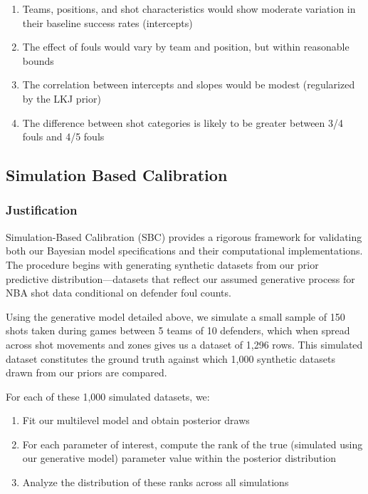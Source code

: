 \documentclass[
  letterpaper,
  DIV=11,
  numbers=noendperiod]{scrartcl}
\begin{document}
\begin{enumerate}
\def\labelenumi{\arabic{enumi}.}
\item
  Teams, positions, and shot characteristics would show moderate
  variation in their baseline success rates (intercepts)
\item
  The effect of fouls would vary by team and position, but within
  reasonable bounds
\item
  The correlation between intercepts and slopes would be modest
  (regularized by the LKJ prior)
\item
  The difference between shot categories is likely to be greater between
  3/4 fouls and 4/5 fouls
\end{enumerate}

\subsection{Simulation Based
Calibration}\label{simulation-based-calibration}

\subsubsection{Justification}\label{justification}

Simulation-Based Calibration (SBC) provides a rigorous framework for
validating both our Bayesian model specifications and their
computational implementations. The procedure begins with generating
synthetic datasets from our prior predictive distribution---datasets
that reflect our assumed generative process for NBA shot data
conditional on defender foul counts.

Using the generative model detailed above, we simulate a small sample of
150 shots taken during games between 5 teams of 10 defenders, which when
spread across shot movements and zones gives us a dataset of 1,296 rows.
This simulated dataset constitutes the ground truth against which 1,000
synthetic datasets drawn from our priors are compared.

For each of these 1,000 simulated datasets, we:

\begin{enumerate}
\def\labelenumi{\arabic{enumi}.}
\item
  Fit our multilevel model and obtain posterior draws
\item
  For each parameter of interest, compute the rank of the true
  (simulated using our generative model) parameter value within the
  posterior distribution
\item
  Analyze the distribution of these ranks across all simulations
\end{enumerate}
\end{document}
